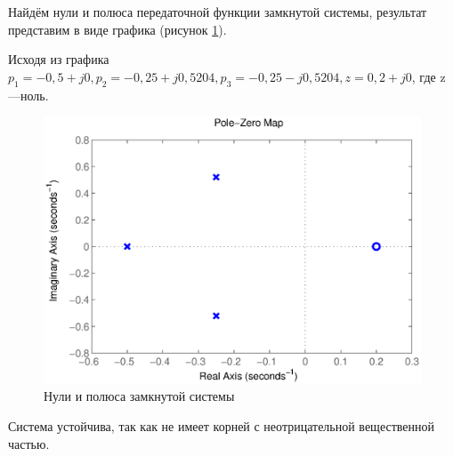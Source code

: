 \documentclass[a4paper,12pt]{article} %
\begin{document}
Найдём нули и полюса передаточной функции замкнутой системы, результат представим в виде графика (рисунок \ref{pzmap2}).\par
Исходя из графика $p_1=-0,5+j0, p_2=-0,25+j0,5204, p_3=-0,25-j0,5204, z=0,2+j0$, где z---ноль.
\begin{figure}[ht!]
	\centering
	\includegraphics[width=1\linewidth]{scheme/pzmap2}
	\caption{Нули и полюса замкнутой системы}
	\label{pzmap2}
\end{figure}\par

Система устойчива, так как не имеет корней с неотрицательной вещественной частью.
\end{document}
